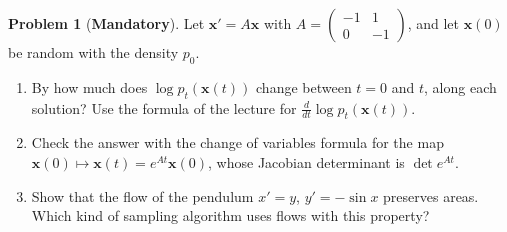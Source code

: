 \documentclass[11pt]{article}
\theoremstyle{definition}
\newtheorem{problem}{Problem}[section]
\newcommand{\mandatory}{\textcolor{red!70!black}{\textbf{Mandatory}}}
\begin{document}
\begin{problem}[\mandatory]\label{pr:cnf-linear}
    Let $\mathbf{x}' = A\mathbf{x}$ with $A = \begin{pmatrix} -1 & 1 \\ 0 & -1 \end{pmatrix}$, and let $\mathbf{x}(0)$ be random with the density $p_0$.
    \begin{enumerate}[label=(\alph*)]
        \item By how much does $\log p_t(\mathbf{x}(t))$ change between $t = 0$ and $t$, along each solution? Use the formula of the lecture for $\frac{d}{dt}\log p_t(\mathbf{x}(t))$.
        \item Check the answer with the change of variables formula for the map $\mathbf{x}(0) \mapsto \mathbf{x}(t) = e^{At}\mathbf{x}(0)$, whose Jacobian determinant is $\det e^{At}$.
        \item Show that the flow of the pendulum $x' = y$, $y' = -\sin x$ preserves areas. Which kind of sampling algorithm uses flows with this property?
    \end{enumerate}
\end{problem}
\end{document}
